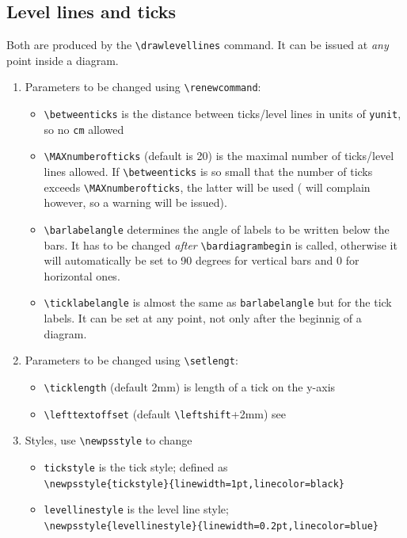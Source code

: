 \documentclass[12pt]{article}
\begin{document}
\subsection{Level lines and ticks \label{sec:3.2}}
 Both are produced by the \verb+\drawlevellines+ command. It can be
 issued at \emph{any} point inside a diagram.
\begin{enumerate}
\item Parameters to be changed using \verb+\renewcommand+:
      \begin{itemize} 
        \item \verb+\betweenticks+ 
          is the distance between
          ticks/level lines in units of \verb+yunit+, so no \texttt{cm}
          allowed 
        \item \verb+\MAXnumberofticks+ 
          (default is 20) is the maximal
          number of ticks/level lines allowed. If \verb+\betweenticks+
          is so small that the number of ticks exceeds
          \verb+\MAXnumberofticks+, the latter will be used (\bard
          will complain however, so a warning will be issued). 
        \item \verb+\barlabelangle+ 
          determines the angle of labels to be written below the
          bars. It has to be changed \emph{after}
          \verb+\bardiagrambegin+
          is called, otherwise it will automatically be set to 90
          degrees for vertical bars and 0 for horizontal ones.
        \item \verb+\ticklabelangle+ is almost the same as 
          \texttt{barlabelangle} but for the tick labels. It can
          be set at any point, not only after the beginnig of a diagram.
      \end{itemize}
\item Parameters to be changed using \verb+\setlengt+:
        \begin{itemize} 
        \item \verb+\ticklength+ 
          (default 2mm) is length of a tick on the y-axis
        \item \verb+\lefttextoffset+ 
              (default \verb+\leftshift++2mm) 
              see 
      \end{itemize}
\item Styles, use \verb+\newpsstyle+ to change
   \begin{itemize}
     \item \verb+tickstyle+  
       is the tick style; defined as\\ 
       \verb+\newpsstyle{tickstyle}{linewidth=1pt,linecolor=black}+
     \item \verb+levellinestyle+ 
       is the level line style;\\
       \verb+\newpsstyle{levellinestyle}{linewidth=0.2pt,linecolor=blue}+
   \end{itemize}
\end{enumerate}
\end{document}

